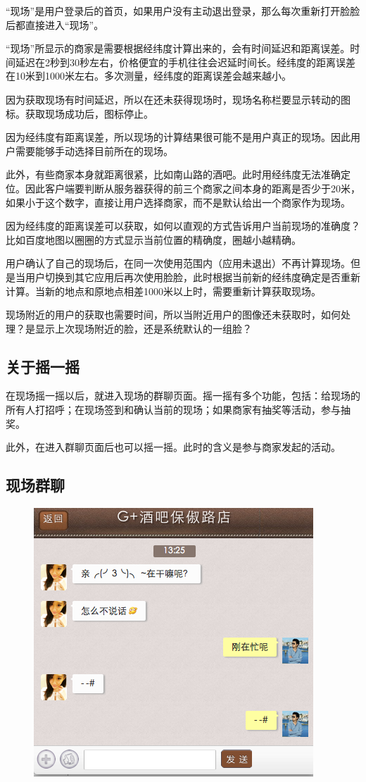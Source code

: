 \documentclass[cs4size]{ctexartutf8}
\begin{document}
“现场”是用户登录后的首页，如果用户没有主动退出登录，那么每次重新打开脸脸后都直接进入“现场”。

“现场”所显示的商家是需要根据经纬度计算出来的，会有时间延迟和距离误差。时间延迟在2秒到30秒左右，价格便宜的手机往往会迟延时间长。经纬度的距离误差在10米到1000米左右。多次测量，经纬度的距离误差会越来越小。

因为获取现场有时间延迟，所以在还未获得现场时，现场名称栏要显示转动的图标。获取现场成功后，图标停止。

因为经纬度有距离误差，所以现场的计算结果很可能不是用户真正的现场。因此用户需要能够手动选择目前所在的现场。

此外，有些商家本身就距离很紧，比如南山路的酒吧。此时用经纬度无法准确定位。因此客户端要判断从服务器获得的前三个商家之间本身的距离是否少于20米，如果小于这个数字，直接让用户选择商家，而不是默认给出一个商家作为现场。

因为经纬度的距离误差可以获取，如何以直观的方式告诉用户当前现场的准确度？比如百度地图以圈圈的方式显示当前位置的精确度，圈越小越精确。



用户确认了自己的现场后，在同一次使用范围内（应用未退出）不再计算现场。但是当用户切换到其它应用后再次使用脸脸，此时根据当前新的经纬度确定是否重新计算。当新的地点和原地点相差1000米以上时，需要重新计算获取现场。

现场附近的用户的获取也需要时间，所以当附近用户的图像还未获取时，如何处理？是显示上次现场附近的脸，还是系统默认的一组脸？

\subsection{关于摇一摇}
在现场摇一摇以后，就进入现场的群聊页面。摇一摇有多个功能，包括：给现场的所有人打招呼；在现场签到和确认当前的现场；如果商家有抽奖等活动，参与抽奖。

此外，在进入群聊页面后也可以摇一摇。此时的含义是参与商家发起的活动。


\subsection{现场群聊}

\begin{figure}[H]
\centering
\includegraphics[scale=0.5]{./4.png}
\end{figure}
\end{document}
